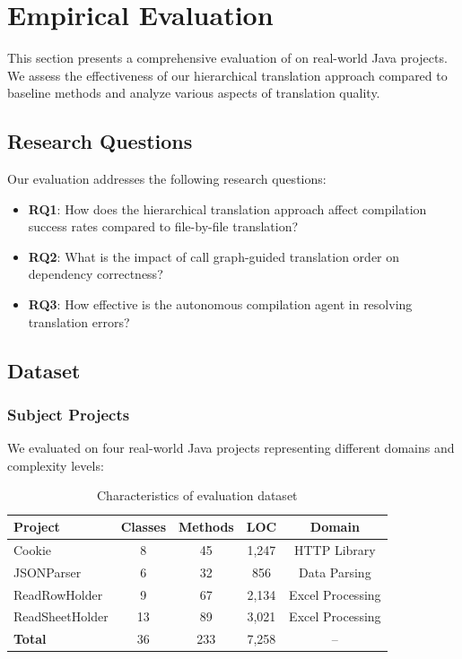
\section{Empirical Evaluation}

This section presents a comprehensive evaluation of \tool{} on real-world Java projects. We assess the effectiveness of our hierarchical translation approach compared to baseline methods and analyze various aspects of translation quality.

\subsection{Research Questions}

Our evaluation addresses the following research questions:

\begin{itemize}
\item \textbf{RQ1}: How does the hierarchical translation approach affect compilation success rates compared to file-by-file translation?
\item \textbf{RQ2}: What is the impact of call graph-guided translation order on dependency correctness?
\item \textbf{RQ3}: How effective is the autonomous compilation agent in resolving translation errors?
\end{itemize}

\subsection{Dataset}

\subsubsection{Subject Projects}
We evaluated \tool{} on four real-world Java projects representing different domains and complexity levels:

\begin{table}[h]
\centering
\small
\begin{tabular}{lcccc}
\toprule
\textbf{Project} & \textbf{Classes} & \textbf{Methods} & \textbf{LOC} & \textbf{Domain} \\
\midrule
Cookie & 8 & 45 & 1,247 & HTTP Library \\
JSONParser & 6 & 32 & 856 & Data Parsing \\
ReadRowHolder & 9 & 67 & 2,134 & Excel Processing \\
ReadSheetHolder & 13 & 89 & 3,021 & Excel Processing \\
\midrule
\textbf{Total} & 36 & 233 & 7,258 & -- \\
\bottomrule
\end{tabular}
\caption{Characteristics of evaluation dataset}
\label{tab:dataset}
\end{table}

